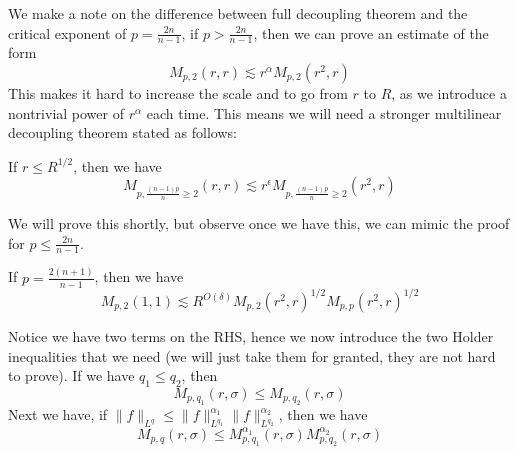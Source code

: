 We make a note on the difference between full decoupling theorem and the critical exponent of $p=\frac{2n}{n-1}$, if $p>\frac{2n}{n-1}$, then we can prove an estimate of the form
\begin{equation*}
    M_{p,2}(r,r)\lesssim r^\alpha M_{p,2}(r^2,r)
\end{equation*}
This makes it hard to increase the scale and to go from $r$ to $R$, as we introduce a nontrivial power of $r^\alpha$ each time. This means we will need a stronger multilinear decoupling theorem stated as follows:
\begin{theorem}[MK2]
    If $r\leq R^{1/2}$, then we have
    \begin{equation*}
        M_{p,\frac{(n-1)p}{n}\geq 2}(r,r)\lesssim r^\epsilon M_{p,\frac{(n-1)p}{n}\geq 2}(r^2,r)
    \end{equation*}
\end{theorem}
We will prove this shortly, but observe once we have this, we can mimic the proof for $p\leq\frac{2n}{n-1}$.
\begin{lemma}
    If $p=\frac{2(n+1)}{n-1}$, then we have
    \begin{equation*}
        M_{p,2}(1,1)\lesssim R^{O(\delta)}M_{p,2}(r^2,r)^{1/2}M_{p,p}(r^2,r)^{1/2}
    \end{equation*}
\end{lemma}
Notice we have two terms on the RHS, hence we now introduce the two Holder inequalities that we need (we will just take them for granted, they are not hard to prove).
If we have $q_1\leq q_2$, then
\begin{equation*}
    M_{p,q_1}(r,\sigma)\leq M_{p,q_2}(r,\sigma)
\end{equation*}
Next we have, if $\|f\|_{L^q}\leq\|f\|_{L^{q_1}}^{\alpha_1}\|f\|_{L^{q_2}}^{\alpha_2}$, then we have
\begin{equation*}
    M_{p,q}(r,\sigma)\leq M_{p,q_1}^{\alpha_1}(r, \sigma)M_{p,q_2}^{\alpha_2}(r,\sigma)
\end{equation*}


